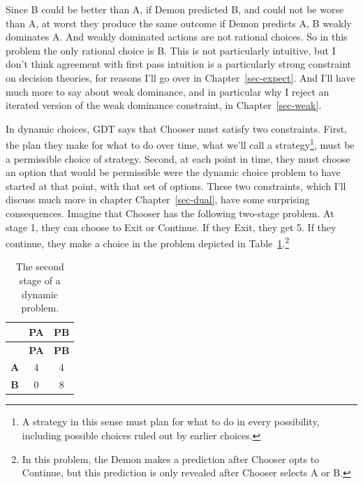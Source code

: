 \documentclass[
  12pt,
  letterpaper,
  DIV=11,
  numbers=noendperiod]{scrreprt}
\begin{document}
Since B could be better than A, if Demon predicted B, and could not be
worse than A, at worst they produce the same outcome if Demon predicts
A, B weakly dominates A. And weakly dominated actions are not rational
choices. So in this problem the only rational choice is B. This is not
particularly intuitive, but I don't think agreement with first pass
intuition is a particularly strong constraint on decision theories, for
reasons I'll go over in Chapter~\ref{sec-expect}. And I'll have much
more to say about weak dominance, and in particular why I reject an
iterated version of the weak dominance constraint, in
Chapter~\ref{sec-weak}.

In dynamic choices, GDT says that Chooser must satisfy two constraints.
First, the plan they make for what to do over time, what we'll call a
strategy\footnote{A strategy in this sense must plan for what to do in
  every possibility, including possible choices ruled out by earlier
  choices.}, must be a permissible choice of strategy. Second, at each
point in time, they must choose an option that would be permissible were
the dynamic choice problem to have started at that point, with that set
of options. These two constraints, which I'll discuss much more in
chapter Chapter~\ref{sec-dual}, have some surprising consequences.
Imagine that Chooser has the following two-stage problem. At stage 1,
they can choose to Exit or Continue. If they Exit, they get 5. If they
continue, they make a choice in the problem depicted in
Table~\ref{tbl-first-dynamic-example}.\footnote{In this problem, the
  Demon makes a prediction after Chooser opts to Continue, but this
  prediction is only revealed after Chooser selects A or B.}

\begin{longtable}[]{@{}ccc@{}}
\caption{The second stage of a dynamic
problem.}\label{tbl-first-dynamic-example}\tabularnewline
\toprule\noalign{}
& \textbf{PA} & \textbf{PB} \\
\midrule\noalign{}
\endfirsthead
\toprule\noalign{}
& \textbf{PA} & \textbf{PB} \\
\midrule\noalign{}
\endhead
\bottomrule\noalign{}
\endlastfoot
\textbf{A} & 4 & 4 \\
\textbf{B} & 0 & 8 \\
\end{longtable}
\end{document}
